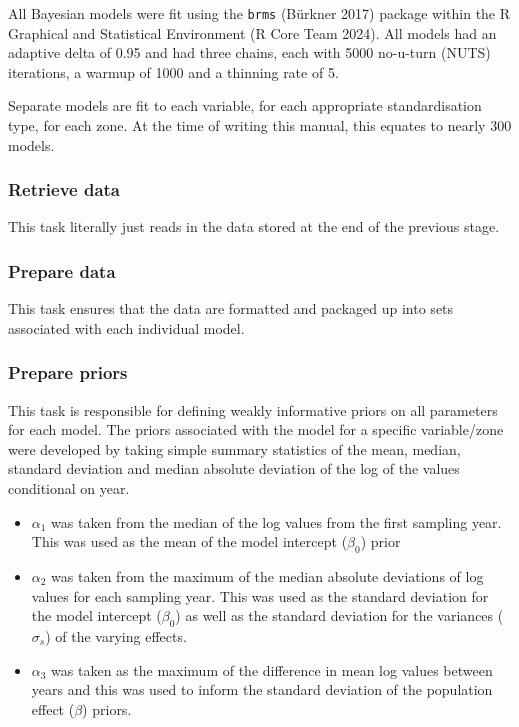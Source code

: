 \documentclass[
  8pt,
  a4paper]{article}
\providecommand{\tightlist}{%
  \setlength{\itemsep}{0pt}\setlength{\parskip}{0pt}}\usepackage{longtable,booktabs,array}
\begin{document}
All Bayesian models were fit using the \texttt{brms} (Bürkner 2017)
package within the R Graphical and Statistical Environment (R Core Team
2024). All models had an adaptive delta of 0.95 and had three chains,
each with 5000 no-u-turn (NUTS) iterations, a warmup of 1000 and a
thinning rate of 5.

Separate models are fit to each variable, for each appropriate
standardisation type, for each zone. At the time of writing this manual,
this equates to nearly 300 models.

\subsubsection{Retrieve data}\label{retrieve-data-1}

This task literally just reads in the data stored at the end of the
previous stage.

\subsubsection{Prepare data}\label{prepare-data}

This task ensures that the data are formatted and packaged up into sets
associated with each individual model.

\subsubsection{Prepare priors}\label{prepare-priors}

This task is responsible for defining weakly informative priors on all
parameters for each model. The priors associated with the model for a
specific variable/zone were developed by taking simple summary
statistics of the mean, median, standard deviation and median absolute
deviation of the log of the values conditional on year.

\begin{itemize}
\tightlist
\item
  \(\alpha_1\) was taken from the median of the log values from the
  first sampling year. This was used as the mean of the model intercept
  (\(\beta_0\)) prior
\item
  \(\alpha_2\) was taken from the maximum of the median absolute
  deviations of log values for each sampling year. This was used as the
  standard deviation for the model intercept (\(\beta_0\)) as well as
  the standard deviation for the variances (\(\sigma_s\)) of the varying
  effects.
\item
  \(\alpha_3\) was taken as the maximum of the difference in mean log
  values between years and this was used to inform the standard
  deviation of the population effect (\(\beta\)) priors.
\end{itemize}
\end{document}
